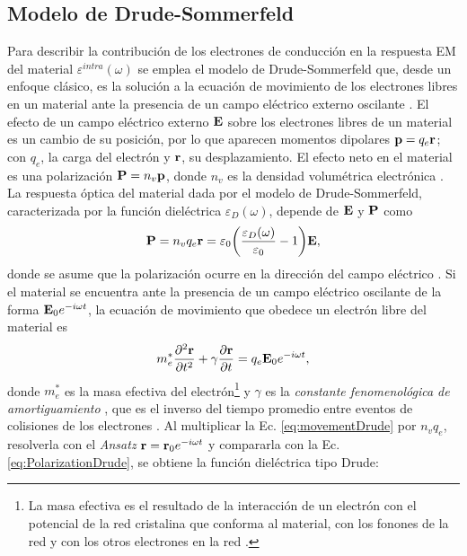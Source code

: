 \subsection{Modelo de Drude-Sommerfeld}

 Para describir la contribución de los electrones de conducción en la respuesta EM del material $\varepsilon^{intra}(\omega)$ se emplea el modelo de Drude-Sommerfeld que, desde un enfoque clásico, es la solución a la ecuación de movimiento de los electrones libres en un material ante la presencia de un campo eléctrico externo oscilante \cite{gross2014festkorperphysik}. El efecto de un campo eléctrico externo $\vb{E}$ sobre los electrones libres de un material es un cambio de su posición, por lo que aparecen momentos dipolares $\vb{p}=q_e\vb{r}$; con $q_e$, la carga del electrón y $\vb{r}$, su desplazamiento.  El efecto neto en el material es una polarización $\vb{P} = n_v \vb{p}$, donde $n_v$ es la densidad volumétrica electrónica \cite{novotny2006principles}.  La respuesta óptica del material dada por el modelo de Drude-Sommerfeld, caracterizada por la función dieléctrica $\varepsilon_D(\omega)$, depende de $\vb{E}$ y $\vb{P}$ como 
	\begin{align}
	\vb{P} = n_v q_e \vb{r} =\varepsilon_0\qty(\frac{\varepsilon_D(\omega)}{\varepsilon_0}-1)\vb{E},
	\label{eq:PolarizationDrude}
	\end{align}
donde se asume que la polarización ocurre en la dirección del campo eléctrico \cite{novotny2006principles}. Si el material se encuentra ante la presencia de un campo eléctrico oscilante de la forma $\vb{E}_0 e^{-i\omega t}$, la ecuación de movimiento que obedece un electrón libre del material es \cite{kreibig1995clusters,gross2014festkorperphysik}
	\begin{align}
	m_e^* \pdv[2]{\vb{r}}{t} +  \gamma \pdv{\vb{r}}{t} = q_e\vb{E}_0e^{-i\omega t},
	\label{eq:movementDrude}
	\end{align}
donde $m_e^*$ es la masa efectiva del electrón\footnote{La masa efectiva es el resultado de la interacción de un electrón con el potencial de la red cristalina que conforma al material, con los fonones de la red y con los otros electrones en la red \cite{gross2014festkorperphysik}. } \cite{gross2014festkorperphysik} y $\gamma$ es la \emph{constante fenomenológica de amortiguamiento} \cite{kreibig1995clusters}, que es el inverso del tiempo promedio entre eventos de colisiones  de los electrones \cite{novotny2006principles,gross2014festkorperphysik}.  Al multiplicar la Ec.  \eqref{eq:movementDrude} por $n_v q_e$, resolverla con el \emph{Ansatz} $\vb{r} = \vb{r}_0e^{-i\omega t}$ y compararla con la Ec.  \eqref{eq:PolarizationDrude}, se obtiene la función dieléctrica tipo Drude: \cite{novotny2006principles,gross2014festkorperphysik}  \vspace*{-.75em}

